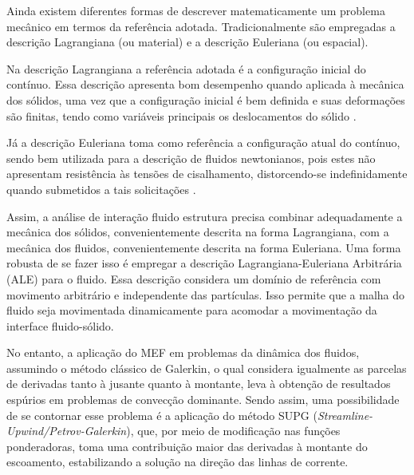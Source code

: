 Ainda existem diferentes formas de descrever matematicamente um problema mecânico em termos da referência adotada. Tradicionalmente são empregadas a descrição Lagrangiana (ou material) e a descrição Euleriana (ou espacial).

Na descrição Lagrangiana a referência adotada é a configuração inicial do contínuo. Essa descrição apresenta bom desempenho quando aplicada à mecânica dos sólidos, uma vez que a configuração inicial é bem definida e suas deformações são finitas, tendo como variáveis principais os deslocamentos do sólido \cite{sanches2014fluid, fernandes2019ale}.

Já a descrição Euleriana toma como referência a configuração atual do contínuo, sendo bem utilizada para a descrição de fluidos newtonianos, pois estes não apresentam resistência às tensões de cisalhamento, distorcendo-se indefinidamente quando submetidos a tais solicitações \cite{sanches2014fluid, fernandes2019ale}.

Assim, a análise de interação fluido estrutura precisa combinar adequadamente a mecânica dos sólidos, convenientemente descrita na forma Lagrangiana, com a mecânica dos fluidos, convenientemente descrita na forma Euleriana. Uma forma robusta de se fazer isso é empregar a descrição Lagrangiana-Euleriana Arbitrária (ALE)  \cite{donea1982arbitrary} para o fluido. Essa descrição considera um domínio de referência com movimento arbitrário e independente das partículas. Isso permite que a malha do fluido seja movimentada dinamicamente para acomodar a movimentação da interface fluido-sólido.


No entanto, a aplicação do MEF em problemas da dinâmica dos fluidos, assumindo o método clássico de Galerkin, o qual considera igualmente as parcelas de derivadas tanto à jusante quanto à montante, leva à obtenção de resultados espúrios em problemas de convecção dominante. Sendo assim, uma possibilidade de se contornar esse problema é a aplicação do método SUPG (\textit{Streamline-Upwind/Petrov-Galerkin}), que, por meio de modificação nas funções ponderadoras, toma uma contribuição maior das derivadas à montante do escoamento, estabilizando a solução na direção das linhas de corrente.

